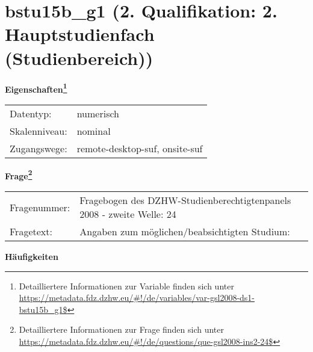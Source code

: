 
    \setcounter{footnote}{0}

    \vspace*{-1.8cm}
	\section{bstu15b\_g1 (2. Qualifikation: 2. Hauptstudienfach (Studienbereich))}
	\label{section:bstu15b_g1}



    \vspace*{0.5cm}
    \noindent\textbf{Eigenschaften\footnote{Detailliertere Informationen zur Variable finden sich unter
		\url{https://metadata.fdz.dzhw.eu/\#!/de/variables/var-gsl2008-ds1-bstu15b_g1$}}}\\
	\begin{tabularx}{\hsize}{@{}lX}
	Datentyp: & numerisch \\
	Skalenniveau: & nominal \\
	Zugangswege: &
	  remote-desktop-suf, 
	  onsite-suf
 \\
    \end{tabularx}



				\vspace*{0.5cm}
                \noindent\textbf{Frage\footnote{Detailliertere Informationen zur Frage finden sich unter
		              \url{https://metadata.fdz.dzhw.eu/\#!/de/questions/que-gsl2008-ins2-24$}}}\\
				\begin{tabularx}{\hsize}{@{}lX}
					Fragenummer: &
					  Fragebogen des DZHW-Studienberechtigtenpanels 2008 - zweite Welle:
					  24
 \\
					Fragetext: & Angaben zum möglichen/beabsichtigten Studium: \\
				\end{tabularx}





        		\vspace*{0.5cm}
                \noindent\textbf{Häufigkeiten}

